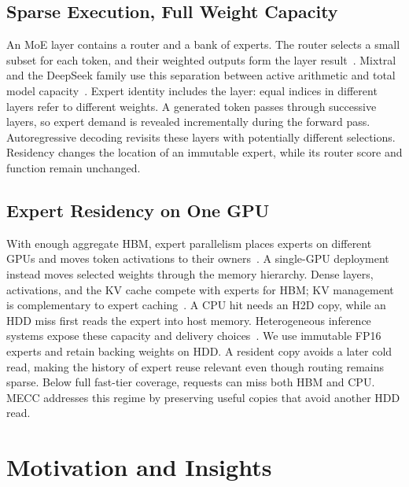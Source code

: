 \documentclass[conference,9pt,letterpaper]{IEEEtran}
\begin{document}
\subsection{Sparse Execution, Full Weight Capacity}
An MoE layer contains a router and a bank of experts. The router selects a small subset for each token, and their weighted outputs form the layer result~\cite{shazeer,switch,gshard}. Mixtral and the DeepSeek family use this separation between active arithmetic and total model capacity~\cite{mixtral,deepseekmoe,deepseekv2,deepseekv3,mixtral22}. Expert identity includes the layer: equal indices in different layers refer to different weights. A generated token passes through successive layers, so expert demand is revealed incrementally during the forward pass. Autoregressive decoding revisits these layers with potentially different selections. Residency changes the location of an immutable expert, while its router score and function remain unchanged.

\subsection{Expert Residency on One GPU}
With enough aggregate HBM, expert parallelism places experts on different GPUs and moves token activations to their owners~\cite{deepspeedmoe,tutel,megablocks,flashmoedist,harmoeny}. A single-GPU deployment instead moves selected weights through the memory hierarchy. Dense layers, activations, and the KV cache compete with experts for HBM; KV management is complementary to expert caching~\cite{pagedattention,sglang}. A CPU hit needs an H2D copy, while an HDD miss first reads the expert into host memory. Heterogeneous inference systems expose these capacity and delivery choices~\cite{flexgen,dsinference,zeroinfinity,llmflash,powerinfer}. We use immutable FP16 experts and retain backing weights on HDD. A resident copy avoids a later cold read, making the history of expert reuse relevant even though routing remains sparse. Below full fast-tier coverage, requests can miss both HBM and CPU. MECC addresses this regime by preserving useful copies that avoid another HDD read.

\section{Motivation and Insights}
\label{sec:challenges}
\end{document}
